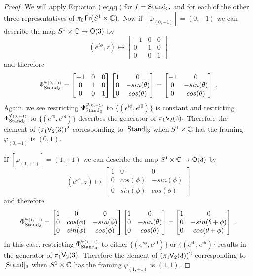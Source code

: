 \begin{proof}
We will apply Equation (\ref{eqqq}) for $f = {\rm Stand}_{3},$ and for each of the other three representatives of $\pi_{0}\operatorname{\sf Fr}(S^1\times \mathbb C).$ Now if $[\varphi_{( 0, -1)}] = ( 0, -1)$ we can describe the map $S^{1} \times \mathbb C \rightarrow \mathsf O(3)$ by
\[
(e^{i\phi}, z)
\longmapsto
\begin{bmatrix}
-1 & 0 & 0\\
0 & 1 & 0\\
0 & 0 & 1
\end{bmatrix}
\]
and therefore 
\[
\Phi^{\varphi_{( 0, -1)}}_{\rm Stand_{3}} = \begin{bmatrix}
-1 & 0 & 0\\
0 & 1 & 0\\
0 & 0 & 1
\end{bmatrix}
\begin{bmatrix} 1 & 0 \\ 0 & -sin(\theta) \\ 0 & cos(\theta) \end{bmatrix} =
\begin{bmatrix} -1 & 0 \\ 0 & -sin(\theta) \\ 0 & cos(\theta) \end{bmatrix} ~.
\]
Again, we see restricting $\Phi^{\varphi_{( 0, -1)}}_{\rm Stand_{3}}$ to $\{(e^{i\phi}, e^{i0})\}$ is constant and restricting $\Phi^{\varphi_{( 0, -1)}}_{\rm Stand_{3}}$ to $\{(e^{i0}, e^{i\theta})\}$ describes the generator of $\pi_{1}\mathsf V_{2}(3).$ Therefore the element of $(\pi_{1}\mathsf V_{2}(3))^{2}$ corresponding to $[\rm Stand]_{3}$ when $S^{1} \times \mathbb C$ has the framing $\varphi_{( 0, -1)}$ is $(0, 1).$ 

If $[\varphi_{( 1, +1)}] = ( 1, +1)$ we can describe the map $S^{1} \times \mathbb C \rightarrow \mathsf O(3)$ by
\[
(e^{i\phi}, z)
\longmapsto
\begin{bmatrix}
1 & 0 & 0\\
0 & cos(\phi) & -sin(\phi)\\
0 & sin(\phi) & cos(\phi)
\end{bmatrix}
\]
and therefore 
\[
\Phi^{\varphi_{( 1, +1)}}_{\rm Stand_{3}} = \begin{bmatrix}
1 & 0 & 0\\
0 & cos(\phi) & -sin(\phi)\\
0 & sin(\phi) & cos(\phi)
\end{bmatrix}
\begin{bmatrix} 1 & 0 \\ 0 & -sin(\theta) \\ 0 & cos(\theta) \end{bmatrix} =
\begin{bmatrix} 1 & 0 \\ 0 & -sin(\theta + \phi) \\ 0 & cos(\theta + \phi) \end{bmatrix} ~.
\]
In this case, restricting $\Phi^{\varphi_{( 1, +1)}}_{\rm Stand_{3}}$ to either $\{(e^{i\phi}, e^{i0})\}$ or $\{(e^{i0}, e^{i\theta})\}$ results in the generator of $\pi_{1}\mathsf V_{2}(3).$ Therefore the element of $(\pi_{1}\mathsf V_{2}(3))^{2}$ corresponding to $[\rm Stand]_{3}$ when $S^{1} \times \mathbb C$ has the framing $\varphi_{( 1, +1)}$ is $(1, 1).$ 


\end{proof}
